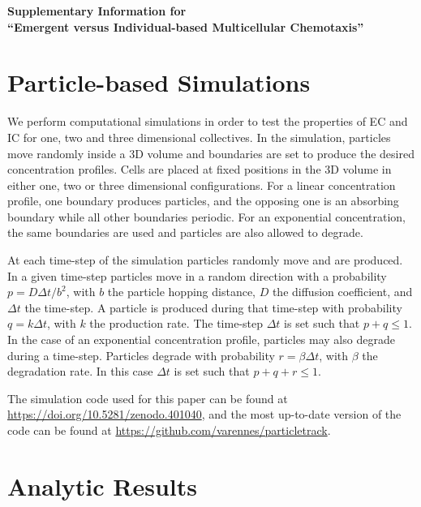 \newpage


\begin{center}
\textbf{\large Supplementary Information for \\ ``Emergent versus Individual-based Multicellular Chemotaxis''}
\end{center}




\section{Particle-based Simulations}

We perform computational simulations in order to test the properties of EC and IC for one, two and three dimensional collectives. In the simulation, particles move randomly inside a 3D volume and boundaries are set to produce the desired concentration profiles. Cells are placed at fixed positions in the 3D volume in either one, two or three dimensional configurations. For a linear concentration profile, one boundary produces particles, and the opposing one is an absorbing boundary while all other boundaries periodic. For an exponential concentration, the same boundaries are used and particles are also allowed to degrade.

At each time-step of the simulation particles randomly move and are produced. In a given time-step particles move in a random direction with a probability
$p = D\Delta t/b^2$,
with $b$ the particle hopping distance, $D$ the diffusion coefficient, and $\Delta t$ the time-step. A particle is produced during that time-step with probability
$q = k\Delta t$,
with $k$ the production rate. The time-step $\Delta t$ is set such that $p + q \leq 1$. In the case of an exponential concentration profile, particles may also degrade during a time-step. Particles degrade with probability
$r = \beta \Delta t$, with $\beta$ the degradation rate. In this case $\Delta t$ is set such that $p + q + r \leq 1$.

The simulation code used for this paper can be found at \url{https://doi.org/10.5281/zenodo.401040}, and the most up-to-date version of the code can be found at \url{https://github.com/varennes/particletrack}.


\section{Analytic Results}

